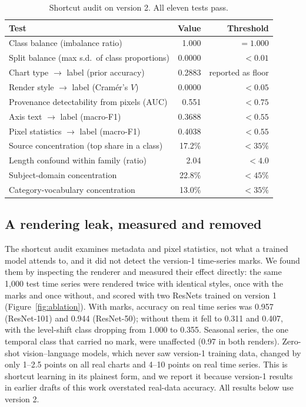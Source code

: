 \documentclass[11pt,a4paper]{article}
\begin{document}
\begin{table}[t]\centering\small
\caption{Shortcut audit on version 2. All eleven tests pass.}
\label{tab:bias}
\begin{tabular}{lrr}
\toprule
\textbf{Test} & \textbf{Value} & \textbf{Threshold} \\
\midrule
Class balance (imbalance ratio)                    & 1.000  & $=1.000$ \\
Split balance (max s.d.\ of class proportions)     & 0.0000 & $<0.01$ \\
Chart type $\rightarrow$ label (prior accuracy)    & 0.2883 & reported as floor \\
Render style $\rightarrow$ label (Cram\'er's $V$)  & 0.0000 & $<0.05$ \\
Provenance detectability from pixels (AUC)         & 0.551  & $<0.75$ \\
Axis text $\rightarrow$ label (macro-F1)           & 0.3688 & $<0.55$ \\
Pixel statistics $\rightarrow$ label (macro-F1)    & 0.4038 & $<0.55$ \\
Source concentration (top share in a class)        & 17.2\% & $<35\%$ \\
Length confound within family (ratio)              & 2.04   & $<4.0$ \\
Subject-domain concentration                       & 22.8\% & $<45\%$ \\
Category-vocabulary concentration                  & 13.0\% & $<35\%$ \\
\bottomrule
\end{tabular}
\end{table}

\subsection*{A rendering leak, measured and removed}
The shortcut audit examines metadata and pixel statistics, not what a trained model
attends to, and it did not detect the version-1 time-series marks. We found them by
inspecting the renderer and measured their effect directly: the same 1{,}000 test time
series were rendered twice with identical styles, once with the marks and once
without, and scored with two ResNets trained on version 1 (Figure~\ref{fig:ablation}).
With marks, accuracy on real time series was 0.957 (ResNet-101) and 0.944
(ResNet-50); without them it fell to 0.311 and 0.407, with the level-shift class
dropping from 1.000 to 0.355. Seasonal series, the one temporal class that carried no
mark, were unaffected (0.97 in both renders). Zero-shot vision--language models, which
never saw version-1 training data, changed by only 1--2.5 points on all real charts
and 4--10 points on real time series. This is shortcut learning\cite{geirhos} in its plainest form, and we report
it because version-1 results in earlier drafts of this work overstated real-data
accuracy. All results below use version 2.
\end{document}
